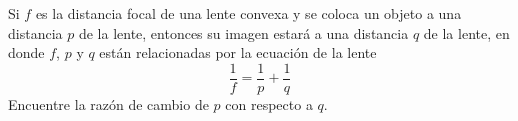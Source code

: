 \item Si $f$ es la distancia focal de una lente convexa y se coloca un objeto a una distancia $p$ de la lente, entonces su imagen estará a una distancia $q$ de la lente, en donde $f$, $p$ y $q$ están relacionadas por la ecuación de la lente
$$\frac{1}{f} = \frac{1}{p} + \frac{1}{q}$$
Encuentre la razón de cambio de $p$ con respecto a $q$.

